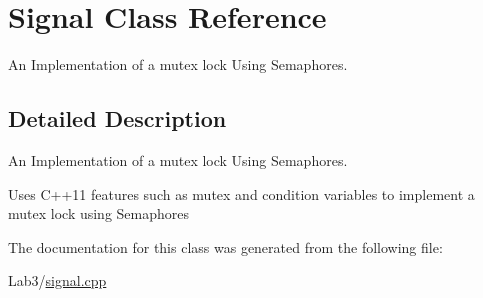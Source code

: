 \hypertarget{class_signal}{}\section{Signal Class Reference}
\label{class_signal}


An Implementation of a mutex lock Using Semaphores.  




\subsection{Detailed Description}
An Implementation of a mutex lock Using Semaphores. 

Uses C++11 features such as mutex and condition variables to implement a mutex lock using Semaphores 

The documentation for this class was generated from the following file\+:\begin{DoxyCompactItemize}
\item 
Lab3/\hyperlink{signal_8cpp}{signal.\+cpp}\end{DoxyCompactItemize}
